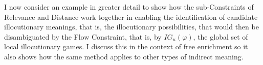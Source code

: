 I now consider an example in greater detail to show how the sub-Constraints of Relevance and Distance work together in enabling the identification of candidate illocutionary meanings, that is, the illocutionary possibilities, that would then be disambiguated by the Flow Constraint, that is, by $IG_u(\varphi)$, the global set of local illocutionary games. I discuss this in the context of free enrichment so it also shows how the same method applies to other types of indirect meaning.





%
%
%
%
%
%
%
%
%
%
%
%
%
%


